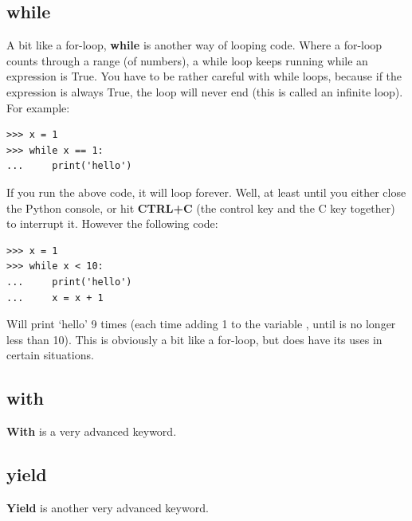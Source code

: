 \subsection*{while}

A bit like a for-loop, \textbf{while} is another way of looping code.  Where a for-loop counts through a range (of numbers), a while loop keeps running while an expression is True.  You have to be rather careful with while loops, because if the expression is always True, the loop will never end (this is called an infinite loop).  For example:

\begin{listingignore}
\begin{verbatim}
>>> x = 1
>>> while x == 1:
...     print('hello')
\end{verbatim}
\end{listingignore}

If you run the above code, it will loop forever.  Well, at least until you either close the Python console, or hit \textbf{CTRL+C} (the control key and the C key together) to interrupt it. However the following code:

\begin{listing}
\begin{verbatim}
>>> x = 1
>>> while x < 10:
...     print('hello')
...     x = x + 1
\end{verbatim}
\end{listing}

Will print `hello' 9 times (each time adding 1 to the variable , until  is no longer less than 10). This is obviously a bit like a for-loop, but does have its uses in certain situations.

\subsection*{with}

\textbf{With} is a very advanced keyword.

\subsection*{yield}
\textbf{Yield} is another very advanced keyword.

\newpage
